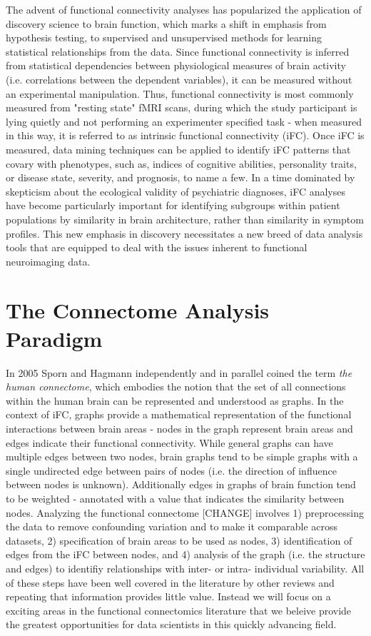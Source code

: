 The advent of functional connectivity analyses has popularized the application
of discovery science to brain function, which marks a shift in emphasis from
hypothesis testing, to supervised and unsupervised methods for learning
statistical relationships from the data. Since functional connectivity is
inferred from statistical dependencies between physiological measures of brain
activity (i.e. correlations between the dependent variables), it can be
measured without an experimental manipulation. Thus, functional connectivity is
most commonly measured from "resting state" fMRI scans, during which the study
participant is lying quietly and not performing an experimenter specified task
- when measured in this way, it is referred to as intrinsic functional
connectivity (iFC). Once iFC is measured, data mining techniques can be applied
to identify iFC patterns that covary with phenotypes, such as, indices of
cognitive abilities, personality traits, or disease state, severity, and
prognosis, to name a few. In a time dominated by skepticism about the
ecological validity of psychiatric diagnoses, iFC analyses have become
particularly important for identifying subgroups within patient populations by
similarity in brain architecture, rather than similarity in symptom profiles.
This new emphasis in discovery necessitates a new breed of data analysis tools
that are equipped to deal with the issues inherent to functional neuroimaging
data.

\section{The Connectome Analysis Paradigm}

In 2005 Sporn and Hagmann \cite{Sporns2005,Hagmann2005} independently and in
parallel coined the term \textit{the human connectome}, which embodies the
notion that the set of all connections within the human brain can be
represented and understood as graphs. In the context of iFC, graphs provide a
mathematical representation of the functional interactions between brain areas -
 nodes in the graph represent brain areas and edges indicate their functional connectivity.
While general graphs can have multiple edges between two nodes, brain
graphs tend to be simple graphs with a single undirected edge between pairs of
nodes (i.e. the direction of influence between nodes is unknown). Additionally
edges in graphs of brain function tend to be weighted - annotated with a value
that indicates the similarity between nodes. Analyzing the functional connectome  [CHANGE]
involves 1) preprocessing the data to remove confounding variation and to make
it comparable across datasets, 2) specification of brain areas to be used as nodes,
3) identification of edges from the iFC between nodes, and 4) analysis of the graph
(i.e. the structure and edges) to identifiy relationships with inter- or intra- individual
variability. All of these steps have been well covered in the literature  by other
reviews and repeating that information provides little value. Instead we will focus on a 
exciting areas in the functional connectomics literature that we beleive provide the greatest
opportunities for data scientists in this quickly advancing field.

